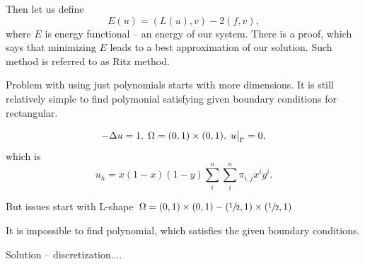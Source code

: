 Then let us define 
\begin{equation}
 E(u) = (L(u),v) - 2(f,v),
 \end{equation}
 where $E$ is energy functional -- an energy of our system. There is a proof, which says that minimizing $E$ leads to a best approximation of our solution. Such method is referred to as Ritz method. 
 
 Problem with using just polynomials starts with more dimensions. It is still relatively simple to find polymonial satisfying given boundary conditions for rectangular.
 
 \begin{center}
\end{center}
 
 
 \begin{equation}
  -\Delta u = 1 , \; \Omega = (0,1) \times (0,1), \; \restr{u}{\Gamma} = 0, 
 \end{equation}
 which is 
 \begin{equation}
  u_{h} = x(1-x)(1-y) \sum_{i}^{n} \sum_{i}^{n}\pi_{i,j}x^{i}y^{i}. 
 \end{equation}
 
 
 But issues start with L-shape $\Omega = (0,1) \times (0,1) - (\sfrac{1}{2},1) \times (\sfrac{1}{2},1) $

 
 \begin{center}
 \end{center}

 It is impossible to find polynomial, which satisfies the given boundary conditions.
 
 Solution -- discretization....
 
